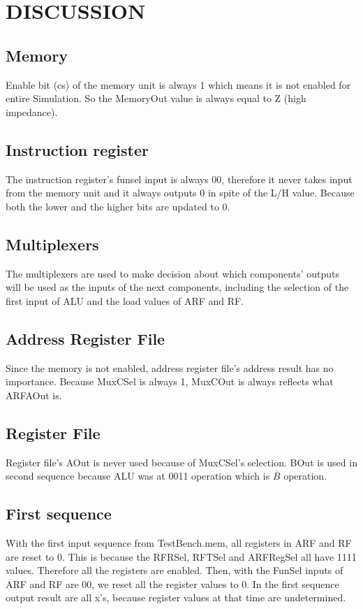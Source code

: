 \documentclass[pdftex,12pt,a4paper]{article}
\begin{document}
\section{DISCUSSION}
\subsection{Memory}
Enable bit (cs) of the memory unit is always 1 which means it is not enabled for entire Simulation. So the MemoryOut value is always
equal to Z (high impedance). 
\subsection{Instruction register}
The instruction register's funsel input is always 00, therefore it never takes input from the memory unit and it always outputs 0 
in spite of the L/H value. Because both the lower and the higher bits are updated to 0.
\subsection{Multiplexers}
The multiplexers are used to make decision about which components' outputs will be used as the inputs of the next components, including
the selection of the first input of ALU and the load values of ARF and RF.
\subsection{Address Register File}
Since the memory is not enabled, address register file's address result has no importance. Because MuxCSel is always 1, MuxCOut is always reflects what
ARFAOut is.
\subsection{Register File}
Register file's AOut is never used because of MuxCSel's selection. BOut is used in second sequence because ALU was at 0011 operation which is
$\overline{B}$ operation.
\subsection{First sequence}
With the first input sequence from TestBench.mem, all registers in ARF and RF are reset to 0. This is because the RFRSel, RFTSel and ARFRegSel all have 
1111 values. Therefore all the registers are enabled. Then, with the FunSel inputs of ARF and RF are 00, we reset all the register
values to 0. In the first sequence output result are all x's, because register values at that time are undetermined.
\end{document}
